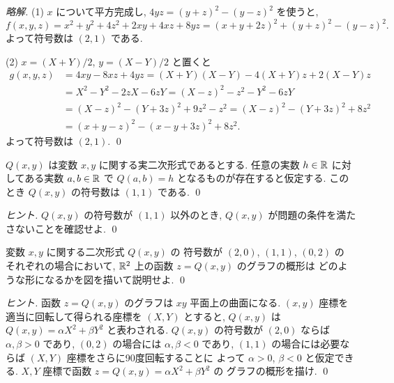 \documentclass[12pt,twoside]{jarticle}
\newcommand\commentout[1]{#1}
\newcommand\commentout[1]{}
\begin{document}
\commentout{
\begin{proof}[略解]
(1) $x$ について平方完成し, $4yz = (y+z)^2 - (y-z)^2$ を使うと,
\begin{equation*}
  f(x,y,z) 
  = x^2 + y^2 + 4z^2 + 2xy + 4xz + 8yz
  = (x+y+2z)^2 + (y+z)^2 - (y-z)^2.
\end{equation*}
よって符号数は $(2,1)$ である.

\bigskip

\noindent
(2) $x=(X+Y)/2$, $y=(X-Y)/2$ と置くと
\begin{align*}
  g(x,y,z) 
  &
  = 4xy - 8xz + 4yz 
  = (X+Y)(X-Y)  - 4(X+Y)z + 2(X-Y)z
  \\ &
  = X^2 - Y^2 - 2zX - 6zY
  = (X - z)^2 - z^2 - Y^2 - 6zY
  \\ &
  = (X - z)^2 - (Y + 3z)^2 + 9z^2 - z^2
  = (X - z)^2 - (Y + 3z)^2 + 8z^2
  \\ &
  = (x + y - z)^2 - (x - y + 3z)^2 + 8z^2.
\end{align*}
よって符号数は $(2,1)$.
\qed
\end{proof}
}

\begin{question}[5点]
\label{q:Sylvester-2}
  $Q(x,y)$ は変数 $x,y$ に関する実二次形式であるとする.
  任意の実数 $h\in{\mathbb R}$ に対してある実数 $a,b\in{\mathbb R}$ 
  で $Q(a,b)=h$ となるものが存在すると仮定する.
  このとき $Q(x,y)$ の符号数は $(1,1)$ である.
  \qed
\end{question}

\begin{proof}[ヒント]
  $Q(x,y)$ の符号数が $(1,1)$ 以外のとき, %
  $Q(x,y)$ が問題の条件を満たさないことを確認せよ.
  \qed
\end{proof}

\begin{question}[10点]
  変数 $x,y$ に関する二次形式 $Q(x,y)$ の
  符号数が $(2,0)$, $(1,1)$, $(0,2)$ の
  それぞれの場合において, ${\mathbb R}^2$ 上の函数 $z=Q(x,y)$ のグラフの概形は
  どのような形になるかを図を描いて説明せよ.
  \qed
\end{question}

\begin{proof}[ヒント]
  函数 $z=Q(x,y)$ のグラフは $xy$ 平面上の曲面になる.
  $(x,y)$ 座標を適当に回転して得られる座標を $(X,Y)$ とすると, %
  $Q(x,y)$ は $Q(x,y)=\alpha X^2 + \beta Y^2$ と表わされる.
  $Q(x,y)$ の符号数が $(2,0)$ ならば $\alpha,\beta>0$ であり, %
  $(0,2)$ の場合には $\alpha,\beta<0$ であり, %
  $(1,1)$ の場合には必要ならば $(X,Y)$ 座標をさらに90度回転することに
  よって $\alpha>0$, $\beta<0$ と仮定できる. 
  $X,Y$ 座標で函数 $z=Q(x,y)=\alpha X^2+\beta Y^2$ の
  グラフの概形を描け.
  \qed
\end{proof}
\end{document}
